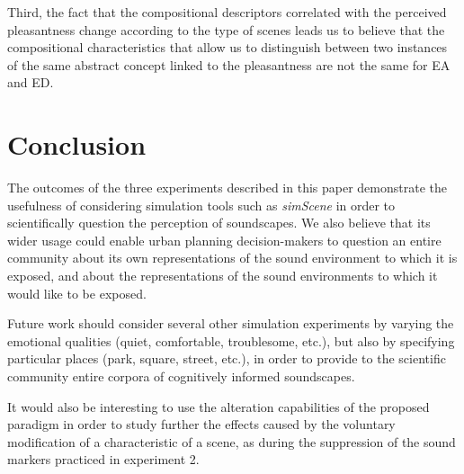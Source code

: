 \documentclass[twoside,twocolumn]{article}
\begin{document}
Third, the fact that the compositional descriptors correlated with the perceived pleasantness change according to the type of scenes leads us to believe that the compositional characteristics that allow us to distinguish between two instances of the same abstract concept linked to the pleasantness are not the same for EA and ED.

\section{Conclusion}


The outcomes of the three experiments described in this paper demonstrate the usefulness of considering simulation tools such as \emph{simScene} in order to scientifically question the perception of soundscapes. We also believe that its wider usage could enable urban planning decision-makers to question an entire community about its own representations of the sound environment to which it is exposed, and about the representations of the sound environments to which it would like to be exposed.


Future work should consider several other simulation experiments by varying the emotional qualities (quiet, comfortable, troublesome, etc.), but also by specifying particular places (park, square, street, etc.), in order to provide to the scientific community entire corpora of cognitively informed soundscapes.


It would also be interesting to use the alteration capabilities of the proposed paradigm in order to study further the effects caused by the voluntary modification of a characteristic of a scene, as during the suppression of the sound markers practiced in experiment 2.
\end{document}
